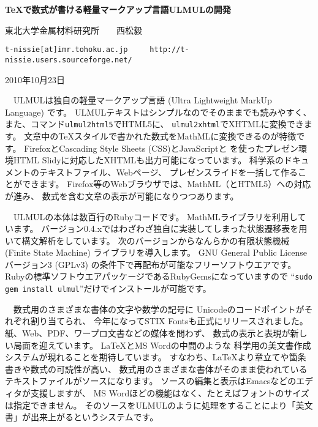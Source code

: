 \documentclass[a4paper,12pt]{jarticle}
\begin{document}
\thispagestyle{empty}
\begin{center}
  {\Large \bf TeXで数式が書ける軽量マークアップ言語ULMULの開発}

  \bigskip

  {東北大学金属材料研究所\ \ \ \ 西松毅}

  {\tt t-nissie[at]imr.tohoku.ac.jp\ \ \ \ \ http://t-nissie.users.sourceforge.net/}

  \smallskip

  2010年10月23日
\end{center}

　ULMULは独自の軽量マークアップ言語 (Ultra Lightweight MarkUp Language) です\cite{ulmul.rubyforge.org}。
ULMULテキストはシンプルなのでそのままでも読みやすく、
また、コマンド{\tt ulmul2html5}でHTML5に、
{\tt ulmul2xhtml}でXHTMLに変換できます。
文章中のTeXスタイルで書かれた数式をMathMLに変換できるのが特徴です。
FirefoxとCascading Style Sheets (CSS)とJavaScriptと
を使ったプレゼン環境HTML Slidy\cite{Slidy}に対応したXHTMLも出力可能になっています。
科学系のドキュメントのテキストファイル、Webページ、
プレゼンスライドを一括して作ることができます。
Firefox等のWebブラウザでは、MathML（とHTML5）への対応が進み、
数式を含む文章の表示が可能になりつつあります。

\bigskip

　ULMULの本体は数百行のRubyコードです。
MathMLライブラリ\cite{ruby-mathml}を利用しています。
バージョン0.4.xではわざわざ独自に実装してしまった状態遷移表を用いて構文解析をしています。
次のバージョンからなんらかの有限状態機械 (Finite State Machine) ライブラリを導入します。
GNU General Public License バージョン3 (GPLv3) の条件下で再配布が可能なフリーソフトウエアです。
Rubyの標準ソフトウエアパッケージであるRubyGemsになっていますので
``{\tt sudo gem install ulmul}''だけでインストールが可能です\cite{ulmul-rubygems}。

\bigskip

　数式用のさまざまな書体の文字や数学の記号に
Unicodeのコードポイントがそれぞれ割り当てられ、
今年になってSTIX Fontsも正式にリリースされました\cite{STIX}。
紙、Web、PDF、ワープロ文書などの媒体を問わず、
数式の表示と表現が新しい局面を迎えています。
\LaTeX とMS Wordの中間のような
科学用の美文書作成システムが現れることを期待しています。
すなわち、\LaTeX より章立てや箇条書きや数式の可読性が高い、
数式用のさまざまな書体がそのまま使われているテキストファイルがソースになります。
ソースの編集と表示はEmacsなどのエディタが支援しますが、
MS Wordほどの機能はなく、たとえばフォントのサイズは指定できません。
そのソースをULMULのように処理をすることにより「美文書」が出来上がるというシステムです。
\end{document}
